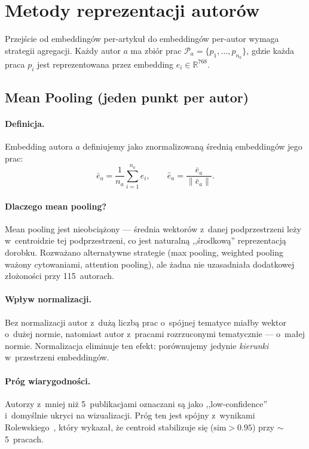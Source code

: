 \documentclass[a4paper,11pt]{article}
\begin{document}
\section{Metody reprezentacji autorów}

Przejście od embeddingów per-artykuł do embeddingów per-autor wymaga strategii agregacji.
Każdy autor $a$ ma zbiór prac $\mathcal{P}_a = \{p_1, \ldots, p_{n_a}\}$, gdzie każda praca $p_i$ jest reprezentowana przez embedding $e_i \in \mathbb{R}^{768}$.

\subsection{Mean Pooling (jeden punkt per autor)}

\paragraph{Definicja.}
Embedding autora $a$ definiujemy jako znormalizowaną średnią embeddingów jego prac:
\begin{equation}
\bar{e}_a = \frac{1}{n_a} \sum_{i=1}^{n_a} e_i, \qquad
\hat{e}_a = \frac{\bar{e}_a}{\|\bar{e}_a\|}.
\end{equation}

\paragraph{Dlaczego mean pooling?}
Mean pooling jest nieobciążony --- średnia wektorów z~danej podprzestrzeni leży w~centroidzie tej podprzestrzeni, co jest naturalną ,,środkową'' reprezentacją dorobku.
Rozważano alternatywne strategie (max pooling, weighted pooling ważony cytowaniami, attention pooling), ale żadna nie uzasadniała dodatkowej złożoności przy 115~autorach.

\paragraph{Wpływ normalizacji.}
Bez normalizacji autor z~dużą liczbą prac o~spójnej tematyce miałby wektor o~dużej normie, natomiast autor z~pracami rozrzuconymi tematycznie --- o~małej normie.
Normalizacja eliminuje ten efekt: porównujemy jedynie \emph{kierunki} w~przestrzeni embeddingów.

\paragraph{Próg wiarygodności.}
Autorzy z~mniej niż 5~publikacjami oznaczani są jako ,,low-confidence'' i~domyślnie ukryci na wizualizacji.
Próg ten jest spójny z~wynikami Rolewskiego~\cite{rolewski2024}, który wykazał, że centroid stabilizuje się ($\text{sim} > 0.95$) przy $\sim$5~pracach.
\end{document}
